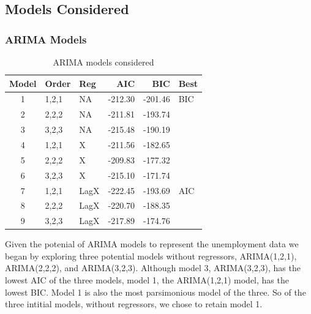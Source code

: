 \documentclass[twoside,twocolumn]{article}
\begin{document}
\subsection{Models Considered}

\subsubsection{ARIMA Models}
\begin{table}[htb]
\centering
\caption{ARIMA models considered}
\label{tab:arimachoices}
\begin{tabular}{cllrrl}
  \hline
 Model & Order & Reg  & AIC & BIC & Best \\ 
  \hline
1 & 1,2,1 &  NA &   -212.30 & -201.46 & BIC \\ 
  2  & 2,2,2 & NA   & -211.81 & -193.74 &  \\ 
  3  & 3,2,3 &  NA  & -215.48 & -190.19 &  \\ 
  4  & 1,2,1 & X  & -211.56 & -182.65 &  \\ 
  5  & 2,2,2 & X   & -209.83 & -177.32 &  \\ 
  6  & 3,2,3 & X   & -215.10 & -171.74 &  \\ 
  7  & 1,2,1 &  LagX & -222.45 & -193.69 & AIC \\ 
  8  & 2,2,2 &  LagX & -220.70 & -188.35 &  \\ 
  9  & 3,2,3 &  LagX & -217.89 & -174.76 &  \\ 
   \hline
\end{tabular}
\end{table}

Given the potenial of ARIMA models to represent the unemployment data we began by exploring three potential models without regressors, ARIMA(1,2,1), ARIMA(2,2,2), and ARIMA(3,2,3). Although model 3, ARIMA(3,2,3), has the lowest AIC of the three models, model 1, the ARIMA(1,2,1) model, has the lowest BIC. Model 1 is also the most parsimonious model of the three. So of the three intitial models, without regressors, we chose to retain model 1.  
\end{document}
